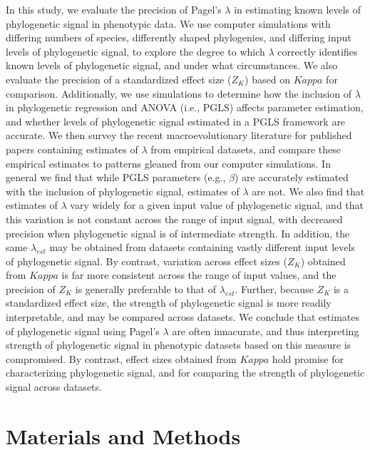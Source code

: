 \documentclass[
]{article}
\begin{document}
In this study, we evaluate the precision of Pagel's \(\lambda\) in
estimating known levels of phylogenetic signal in phenotypic data. We
use computer simulations with differing numbers of species, differently
shaped phylogenies, and differing input levels of phylogenetic signal,
to explore the degree to which \(\lambda\) correctly identifies known
levels of phylogenetic signal, and under what circumstances. We also
evaluate the precision of a standardized effect size (\(Z_K\)) based on
\(Kappa\) for comparison. Additionally, we use simulations to determine
how the inclusion of \(\lambda\) in phylogenetic regression and ANOVA
(i.e., PGLS) affects parameter estimation, and whether levels of
phylogenetic signal estimated in a PGLS framework are accurate. We then
survey the recent macroevolutionary literature for published papers
containing estimates of \(\lambda\) from empirical datasets, and compare
these empirical estimates to patterns gleaned from our computer
simulations. In general we find that while PGLS parameters (e.g.,
\(\beta\)) are accurately estimated with the inclusion of phylogenetic
signal, estimates of \(\lambda\) are not. We also find that estimates of
\(\lambda\) vary widely for a given input value of phylogenetic signal,
and that this variation is not constant across the range of input
signal, with decreased precision when phylogenetic signal is of
intermediate strength. In addition, the same \(\lambda_{est}\) may be
obtained from datasets containing vastly different input levels of
phylogenetic signal. By contrast, variation across effect sizes
(\(Z_K\)) obtained from \(Kappa\) is far more consistent across the
range of input values, and the precision of \(Z_K\) is generally
preferable to that of \(\lambda_{est}\). Further, because \(Z_K\) is a
standardized effect size, the strength of phylogenetic signal is more
readily interpretable, and may be compared across datasets. We conclude
that estimates of phylogenetic signal using Pagel's \(\lambda\) are
often innacurate, and thus interpreting strength of phylogenetic signal
in phenotypic datasets based on this measure is compromised. By
contrast, effect sizes obtained from \(Kappa\) hold promise for
characterizing phylogenetic signal, and for comparing the strength of
phylogenetic signal across datasets.

\hypertarget{materials-and-methods}{%
\section{Materials and Methods}\label{materials-and-methods}}
\end{document}
